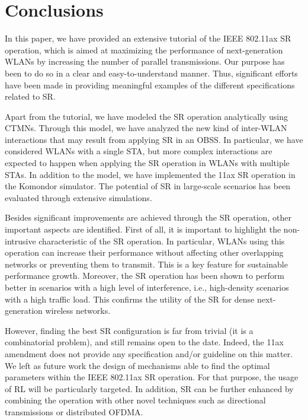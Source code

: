 \documentclass[preprint,12pt]{elsarticle}
\begin{document}
	\section{Conclusions}
	\label{section:conclusions}
	
	In this paper, we have provided an extensive tutorial of the IEEE 802.11ax SR operation, which is aimed at maximizing the performance of next-generation WLANs by increasing the number of parallel transmissions. Our purpose has been to do so in a clear and easy-to-understand manner. Thus, significant efforts have been made in providing meaningful examples of the different specifications related to SR. %
	
	Apart from the tutorial, we have modeled the SR operation analytically using CTMNs. Through this model, we have analyzed the new kind of inter-WLAN interactions that may result from applying SR in an OBSS. In particular, we have considered WLANs with a single STA, but more complex interactions are expected to happen when applying the SR operation in WLANs with multiple STAs. In addition to the model, we have implemented the 11ax SR operation in the Komondor simulator. The potential of SR in large-scale scenarios has been evaluated through extensive simulations.
	
	Besides significant improvements are achieved through the SR operation, other important aspects are identified. First of all, it is important to highlight the non-intrusive characteristic of the SR operation. In particular, WLANs using this operation can increase their performance without affecting other overlapping networks or preventing them to transmit. This is a key feature for sustainable performance growth. Moreover, the SR operation has been shown to perform better in scenarios with a high level of interference, i.e., high-density scenarios with a high traffic load. This confirms the utility of the SR for dense next-generation wireless networks. 
	
	However, finding the best SR configuration is far from trivial (it is a combinatorial problem), and still remains open to the date. Indeed, the 11ax amendment does not provide any specification and/or guideline on this matter. We left as future work the design of mechanisms able to find the optimal parameters within the IEEE 802.11ax SR operation. For that purpose, the usage of RL will be particularly targeted. In addition, SR can be further enhanced by combining the operation with other novel techniques such as directional transmissions or distributed OFDMA.
	
\end{document}
